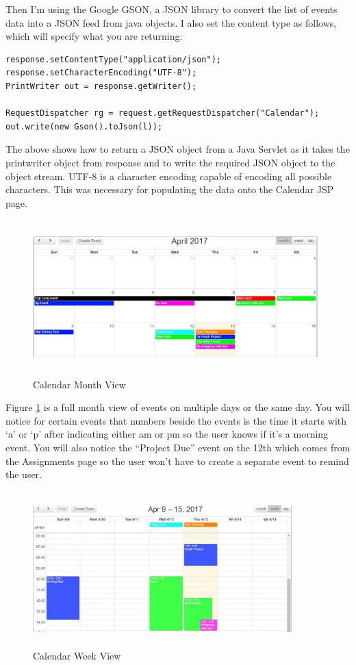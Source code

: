 \newpage
\par
Then I’m using the Google GSON, a JSON library to convert the list of events data into a JSON feed from java objects\cite{Calendar}. I also set the content type as follows, which will specify what you are returning:
\begin{verbatim}
response.setContentType("application/json");
response.setCharacterEncoding("UTF-8");
PrintWriter out = response.getWriter();

RequestDispatcher rg = request.getRequestDispatcher("Calendar");
out.write(new Gson().toJson(l));
\end{verbatim}
The above shows how to return a JSON object from a Java Servlet as it takes the printwriter object from response and to write the required JSON object to the object stream. UTF-8 is a character encoding capable of encoding all possible characters. This was necessary for populating the data onto the Calendar JSP page.

\begin{figure}[h]
\centering
\includegraphics[width=11cm, height=6cm]{img/CalendarMonth}
\caption{Calendar Month View}
\label{fig:MonthView}
\end{figure}
\newpage
Figure \ref{fig:MonthView} is a full month view of events on multiple days or the same day. You will notice for certain events that numbers beside the events is the time it starts with ‘a’ or ‘p’ after indicating either am or pm so the user knows if it’s a morning event. You will also notice the “Project Due” event on the 12th which comes from the Assignments page so the user won’t have to create a separate event to remind the user.

\begin{figure}[h]
\centering
\includegraphics[width=10cm, height=6cm]{img/CalendarWeek}
\caption{Calendar Week View}
\label{fig:WeekView}
\end{figure}

